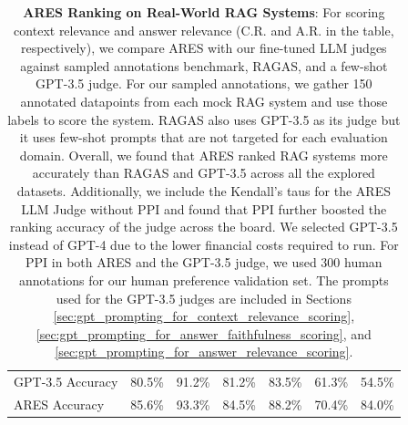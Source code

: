 \begin{table}[]
\begin{tabular}{lllllll}
GPT-3.5 Accuracy                                                                & 80.5\%                   & 91.2\%                   & 81.2\%                   & 83.5\%                   & 61.3\%                   & 54.5\%                   \\
ARES Accuracy                                                                   & 85.6\%                   & 93.3\%                   & 84.5\%                   & 88.2\%                   & 70.4\%                   & 84.0\%  \\ \bottomrule                
\end{tabular}
\caption{\textbf{ARES Ranking on Real-World RAG Systems}: 
For scoring context relevance and answer relevance (C.R. and A.R. in the table, respectively), we compare ARES with our fine-tuned LLM judges against sampled annotations benchmark, RAGAS, and a few-shot GPT-3.5 judge.
For our sampled annotations, we gather 150 annotated datapoints from each mock RAG system and use those labels to score the system.
RAGAS also uses GPT-3.5 as its judge but it uses few-shot prompts that are not targeted for each evaluation domain.
Overall, we found that ARES ranked RAG systems more accurately than RAGAS and GPT-3.5 across all the explored datasets.
Additionally, we include the Kendall's taus for the ARES LLM Judge without PPI and found that PPI further boosted the ranking accuracy of the judge across the board.
We selected GPT-3.5 instead of GPT-4 due to the lower financial costs required to run. %
For PPI in both ARES and the GPT-3.5 judge, we used 300 human annotations for our human preference validation set.
The prompts used for the GPT-3.5 judges are included in Sections \ref{sec:gpt_prompting_for_context_relevance_scoring}, \ref{sec:gpt_prompting_for_answer_faithfulness_scoring}, and \ref{sec:gpt_prompting_for_answer_relevance_scoring}.}
\label{tab:ares_real_systems}
\end{table}
